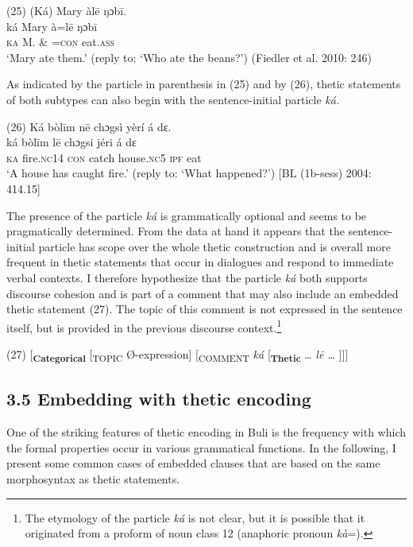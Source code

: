 \documentclass[output=paper]{langsci/langscibook}
\begin{document}
\ea
\glll \textup{(25)}  (Ká)  Mary  àl\={e}    ŋɔb\={i}.\\
  \textup{  ká  Mary  à=l\={e}    ŋɔb\={i}}\\
     \textsc{  }\textsc{ka}  M.  \& =\textsc{con}  eat.\textsc{ass}\\
\glt ‘Mary ate them.’ (reply to: ‘Who ate the beans?’) (Fiedler et al. 2010: 246)
\z

As indicated by the particle in parenthesis in (25) and by (26), thetic statements of both subtypes can also begin with the sentence-initial particle \textit{ká. }

\ea
\glll \textup{(26)}  Ká  bòl\={i}m    n\={e}  chɔgsì  yèrí    á  dɛ.\\
  \textup{  ká  bòl\={i}m    l\={e}  chɔgsi  jéri    á  dɛ}\\
     \textsc{  ka}  fire.\textsc{nc}14  \textsc{con}  catch   house.\textsc{nc}5   \textsc{ipf}   eat\\
\glt ‘A house has caught fire.’ (reply to: ‘What happened?’) [BL (1b-sess) 2004: 414.15]
\z

The presence of the particle \textit{ká }is grammatically optional and seems to be pragmatically determined. From the data at hand it appears that the sentence-initial particle has scope over the whole thetic construction and is overall more frequent in thetic statements that occur in dialogues and respond to immediate verbal contexts. I therefore hypothesize that the particle \textit{ká }both supports discourse cohesion and is part of a comment that may also include an embedded thetic statement (27). The topic of this comment is not expressed in the sentence itself, but is provided in the previous discourse context.\footnote{   The etymology of the particle \textit{ká }is not clear, but it is possible that it originated from a proform of noun class 12 (anaphoric pronoun \textit{kà}=).} 

\ea
{(27)  [\textbf{\textsubscript{Categorical}}\textsubscript{ }[\textsubscript{TOPIC }Ø-expression]\textsubscript{ }[\textsubscript{COMMENT}\textit{ ká} [\textbf{\textsubscript{Thetic}} … \textit{l\={e} … }]]]}
\z

\subsection{3.5 Embedding with thetic encoding}

One of the striking features of thetic encoding in Buli is the frequency with which the formal properties occur in various grammatical functions. In the following, I present some common cases of embedded clauses that are based on the same morphosyntax as thetic statements.
\end{document}
